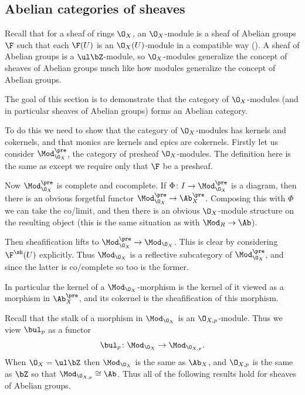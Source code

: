 \subsection{Abelian categories of sheaves}

Recall that for a sheaf of rings $\O_X$, an {\emphcolor $\O_X$-module} is a sheaf of Abelian groups $\F$ such that each
$\F(U)$ is an $\O_X(U)$-module in a compatible way ().
A sheaf of Abelian groups is a $\ul\bZ$-module, so $\O_X$-modules generalize the concept of sheaves of Abelian groups much like
how modules generalize the concept of Abelian groups.

The goal of this section is to demonstrate that the category of $\O_X$-modules (and in particular sheaves of Abelian groups)
forms an Abelian category.

To do this we need to show that the category of $\O_X$-modules has kernels and cokernels, and that monics are kernels and
epics are cokernels.
Firstly let us consider $\Mod^\pre_{\O_X}$, the category of presheaf $\O_X$-modules.
The definition here is the same as  except we require only that $\F$ be a presheaf.

Now $\Mod^\pre_{\O_X}$ is complete and cocomplete.
If $\Phi\colon I\to\Mod^\pre_{\O_X}$ is a diagram, then there is an obvious forgetful functor
$\Mod^\pre_{\O_X}\to\Ab^\pre_X$.
Composing this with $\Phi$ we can take the co/limit, and then there is an obvious $\O_X$-module structure on the resulting
object (this is the same situation as with $\Mod_R\to\Ab$).

Then sheafification lifts to $\Mod^\pre_{\O_X}\to\Mod_{\O_X}$.
This is clear by considering $\F^\sh(U)$ explicitly.
Thus $\Mod_{\O_X}$ is a reflective subcategory of $\Mod^\pre_{\O_X}$, and since the latter is co/complete so too is the former.

In particular the kernel of a $\Mod_{\O_X}$-morphism is the kernel of it viewed as a morphism in $\Ab^\pre_X$,
and its cokernel is the sheafification of this morphism.

Recall that the stalk of a morphism in $\Mod_{\O_X}$ is an $\O_{X,p}$-module.
Thus we view $\bul_p$ as a functor
$$ \bul_p\colon \Mod_{\O_X} \to \Mod_{\O_{X,p}} . $$
When $\O_X=\ul\bZ$ then $\Mod_{\O_X}$ is the same as $\Ab_X$, and $\O_{X,p}$ is the same as $\bZ$ so that
$\Mod_{\O_{X,p}}\cong\Ab$.
Thus all of the following results hold for sheaves of Abelian groups.

\blemm[name={stalkco/ker}]


